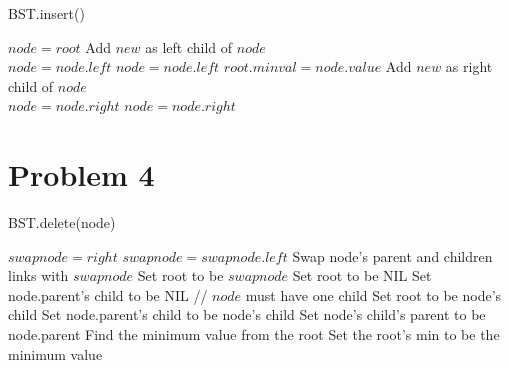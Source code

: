 \documentclass[12pt, letterpaper]{article}
\begin{document}
\begin{algorithm}
    \caption{BST.insert()}
    \begin{minipage}{\textwidth}
        \begin{algorithmic}[1]
            \STATE $node = root$
                        \STATE Add $new$ as left child of $node$ \\
                        \STATE $node = node.left$
                    \ELSE
                        \STATE $node = node.left$
                    \ENDIF
                        \STATE $root.minval = node.value$
                    \ENDIF
                \ELSE
                        \STATE Add $new$ as right child of $node$ \\
                        $node = node.right$
                    \ELSE
                        \STATE $node = node.right$
                    \ENDIF
                \ENDIF
            \ENDWHILE
        \end{algorithmic}
    \end{minipage}
\end{algorithm}

\break
\section*{Problem 4}

\begin{algorithm}
    \caption{BST.delete(node)}
    \begin{minipage}{\textwidth}
        \begin{algorithmic}[1]
                \STATE $swapnode = right$
                    \STATE $swapnode = swapnode.left$
                \ENDWHILE
                \STATE Swap node's parent and children links with $swapnode$
                    \STATE Set root to be $swapnode$
                \ENDIF
            \ENDIF
                    \STATE Set root to be NIL
                \ELSE
                    \STATE Set node.parent's child to be NIL
                \ENDIF
            \ELSE
                \STATE // $node$ must have one child
                    \STATE Set root to be node's child
                \ELSE
                    \STATE Set node.parent's child to be node's child
                \ENDIF
                \STATE Set node's child's parent to be node.parent
                \STATE Find the minimum value from the root
                \STATE Set the root's min to be the minimum value
            \ENDIF
        \end{algorithmic}
    \end{minipage}
\end{algorithm}
\end{document}

